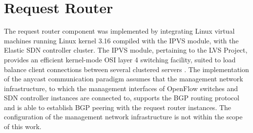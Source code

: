 \section{Request Router}
\label{section:request-router-implementation}
The request router component was implemented by integrating Linux virtual machines running Linux kernel 3.16 compiled with the \gls{IPVS} module, with the Elastic \gls{SDN} controller cluster.
The \gls{IPVS} module, pertaining to the \gls{LVS} Project, provides an efficient kernel-mode \gls{OSI} layer 4 switching facility, suited to load balance client connections between several clustered servers \cite{LVS}.
The implementation of the \gls{anycast} communication paradigm assumes that the management network infrastructure, to which the management interfaces of OpenFlow switches and \gls{SDN} controller instances are connected to, supports the \gls{BGP} routing protocol and is able to establish \gls{BGP} peering with the request router instances.
The configuration of the management network infrastructure is not within the scope of this work.
%

